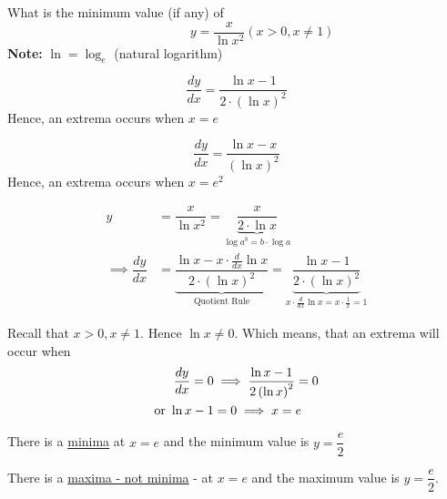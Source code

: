 \documentclass[14pt,fleqn]{extarticle}
\begin{document}
\begin{question}
\statement
	
What is the minimum value (if any) of
\[ \qquad \qquad y = \dfrac{x}{\ln x^2} \left( x > 0, x\neq 1\right)  \] 
\textbf{Note: }$\ln = \log_e$ (natural logarithm)
%
\begin{step}
	\begin{options}
		\correct

		\[\dfrac{dy}{dx} = \dfrac{\ln x - 1}{2\cdot \left(\ln x\right)^2}\]
		Hence, an extrema occurs when $x = e$ 

		\incorrect

		\[\dfrac{dy}{dx} = \dfrac{\ln x - x}{\left(\ln x\right)^2}\]
		Hence, an extrema occurs when $x = e^2$ 
	\end{options}
	\reason

	\begin{align}
y &= \dfrac{x}{\ln x^2} = \underbrace{\dfrac{x}{2\cdot\ln x}}_{\log a^b = b\cdot\log a}\\ 
\implies\dfrac{dy}{dx} &= \underbrace{\dfrac{\ln x - x\cdot\frac{d}{dx}\ln x}
{2\cdot\left(\ln x\right)^2}}_{\text{Quotient Rule}} = 
\underbrace{\dfrac{\ln x - 1}{2\cdot \left(\ln x\right)^2}}_{x\cdot\frac{d}{dx}\ln x = x\cdot\frac{1}{x} = 1}
\end{align}

Recall that $x > 0, x\neq 1$. Hence $\ln x\neq 0$. Which means, that an extrema 
will occur when 
\begin{align}
	\frac{dy}{dx} = 0 &\implies \dfrac{\ln x - 1}{2 \left(\ln x \right)^2} = 0 \\
	\text{or } \ln x -1 &= 0 \implies x = e
\end{align}


\end{step}

\begin{step}
	\begin{options}
		\correct

		There is a \underline{minima} at $x = e$ and the minimum value is 
		$y = \dfrac{e}{2}$ 
%

		\incorrect

There is a \underline{maxima - not minima} - at $x = e$ 
and the maximum value is $y = \dfrac{e}{2}$.

	\end{options}
	\reason


\end{step}
\end{question}
\end{document}
